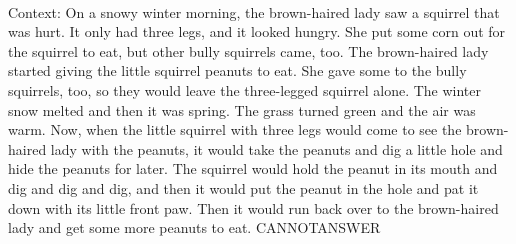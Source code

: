 \documentclass[11pt,a4paper, onecolumn]{article}
\begin{document}
\\ Context: On a snowy winter morning, the brown-haired lady saw a squirrel that was hurt. It only had three legs, and it looked hungry. She put some corn out for the squirrel to eat, but other bully squirrels came, too. The brown-haired lady started giving the little squirrel peanuts to eat. She gave some to the bully squirrels, too, so they would leave the three-legged squirrel alone. The winter snow melted and then it was spring. The grass turned green and the air was warm. Now, when the little squirrel with three legs would come to see the brown-haired lady with the peanuts, it would take the peanuts and dig a little hole and hide the peanuts for later. The squirrel would hold the peanut in its mouth and dig and dig and dig, and then it would put the peanut in the hole and pat it down with its little front paw. Then it would run back over to the brown-haired lady and get some more peanuts to eat. CANNOTANSWER
\end{document}
